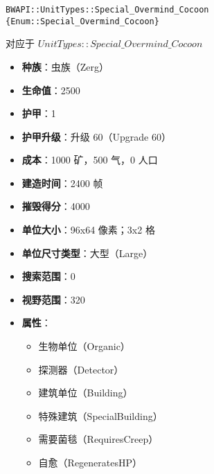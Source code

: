 \begin{tcolorbox}[colback=white, colframe=black!60!white, title=Special\_Overmind\_Cocoon(), arc=0mm]
    \begin{verbatim}
BWAPI::UnitTypes::Special_Overmind_Cocoon {Enum::Special_Overmind_Cocoon}
    \end{verbatim}
    对应于  $UnitTypes::Special\_Overmind\_Cocoon$ 
    \begin{itemize}
        \item \textbf{种族}：虫族（Zerg）
        \item \textbf{生命值}：2500
        \item \textbf{护甲}：1
        \item \textbf{护甲升级}：升级 60（Upgrade 60）
        \item \textbf{成本}：1000 矿，500 气，0 人口
        \item \textbf{建造时间}：2400 帧
        \item \textbf{摧毁得分}：4000
        \item \textbf{单位大小}：96x64 像素；3x2 格
        \item \textbf{单位尺寸类型}：大型（Large）
        \item \textbf{搜索范围}：0
        \item \textbf{视野范围}：320
        \item \textbf{属性}：
            \begin{itemize}
                \item 生物单位（Organic）
                \item 探测器（Detector）
                \item 建筑单位（Building）
                \item 特殊建筑（SpecialBuilding）
                \item 需要菌毯（RequiresCreep）
                \item 自愈（RegeneratesHP）
            \end{itemize}
    \end{itemize}
\end{tcolorbox}

